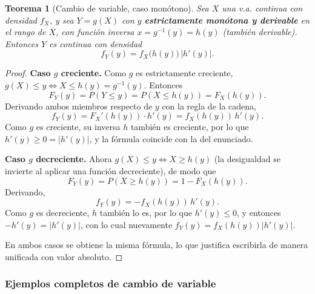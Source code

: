 \documentclass[11pt,a4paper]{article}
\theoremstyle{plain}
\newtheorem{teorema}{Teorema}[section]
\theoremstyle{definition}
\theoremstyle{remark}
\begin{document}
\begin{teorema}[Cambio de variable, caso monótono]\label{thm:jacobiano}
Sea $X$ una v.a. continua con densidad $f_X$, y sea $Y=g(X)$ con $g$ \textbf{estrictamente monótona y derivable} en el rango de $X$, con función inversa $x=g^{-1}(y)=h(y)$ (también derivable). Entonces $Y$ es continua con densidad
$$f_Y(y)=f_X\big(h(y)\big)\,\big|h'(y)\big|.$$
\end{teorema}
\begin{proof}
\textbf{Caso $g$ creciente.} Como $g$ es estrictamente creciente, $g(X)\le y \iff X\le h(y)=g^{-1}(y)$. Entonces
$$F_Y(y)=P(Y\le y)=P(X\le h(y))=F_X(h(y)).$$
Derivando ambos miembros respecto de $y$ con la regla de la cadena,
$$f_Y(y)=F_X'(h(y))\cdot h'(y)=f_X(h(y))\,h'(y).$$
Como $g$ es creciente, su inversa $h$ también es creciente, por lo que $h'(y)\ge0=|h'(y)|$, y la fórmula coincide con la del enunciado.

\textbf{Caso $g$ decreciente.} Ahora $g(X)\le y \iff X\ge h(y)$ (la desigualdad se invierte al aplicar una función decreciente), de modo que
$$F_Y(y)=P(X\ge h(y))=1-F_X(h(y)).$$
Derivando,
$$f_Y(y)=-f_X(h(y))\,h'(y).$$
Como $g$ es decreciente, $h$ también lo es, por lo que $h'(y)\le0$, y entonces $-h'(y)=|h'(y)|$, con lo cual nuevamente $f_Y(y)=f_X(h(y))|h'(y)|$.

En ambos casos se obtiene la misma fórmula, lo que justifica escribirla de manera unificada con valor absoluto.
\end{proof}

\subsubsection{Ejemplos completos de cambio de variable}
\end{document}
